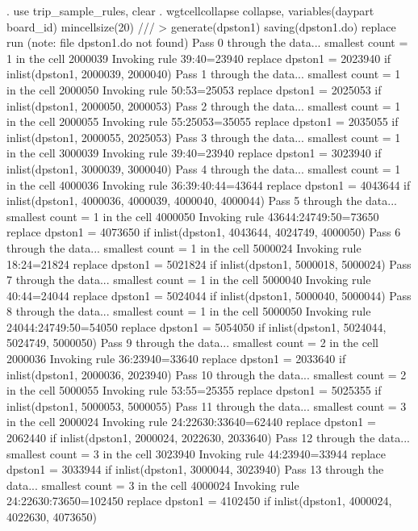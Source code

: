 . use trip_sample_rules, clear
{\smallskip}
. wgtcellcollapse collapse, variables(daypart board_id) mincellsize(20) ///
>         generate(dpston1) saving(dpston1.do) replace run
(note: file dpston1.do not found)
Pass 0 through the data...
  smallest count = 1 in the cell      2000039
  Invoking rule 39:40=23940
  replace dpston1 = 2023940 if inlist(dpston1, 2000039, 2000040)
Pass 1 through the data...
  smallest count = 1 in the cell      2000050
  Invoking rule 50:53=25053
  replace dpston1 = 2025053 if inlist(dpston1, 2000050, 2000053)
Pass 2 through the data...
  smallest count = 1 in the cell      2000055
  Invoking rule 55:25053=35055
  replace dpston1 = 2035055 if inlist(dpston1, 2000055, 2025053)
Pass 3 through the data...
  smallest count = 1 in the cell      3000039
  Invoking rule 39:40=23940
  replace dpston1 = 3023940 if inlist(dpston1, 3000039, 3000040)
Pass 4 through the data...
  smallest count = 1 in the cell      4000036
  Invoking rule 36:39:40:44=43644
  replace dpston1 = 4043644 if inlist(dpston1, 4000036, 4000039, 4000040, 4000044)
Pass 5 through the data...
  smallest count = 1 in the cell      4000050
  Invoking rule 43644:24749:50=73650
  replace dpston1 = 4073650 if inlist(dpston1, 4043644, 4024749, 4000050)
Pass 6 through the data...
  smallest count = 1 in the cell      5000024
  Invoking rule 18:24=21824
  replace dpston1 = 5021824 if inlist(dpston1, 5000018, 5000024)
Pass 7 through the data...
  smallest count = 1 in the cell      5000040
  Invoking rule 40:44=24044
  replace dpston1 = 5024044 if inlist(dpston1, 5000040, 5000044)
Pass 8 through the data...
  smallest count = 1 in the cell      5000050
  Invoking rule 24044:24749:50=54050
  replace dpston1 = 5054050 if inlist(dpston1, 5024044, 5024749, 5000050)
Pass 9 through the data...
  smallest count = 2 in the cell      2000036
  Invoking rule 36:23940=33640
  replace dpston1 = 2033640 if inlist(dpston1, 2000036, 2023940)
Pass 10 through the data...
  smallest count = 2 in the cell      5000055
  Invoking rule 53:55=25355
  replace dpston1 = 5025355 if inlist(dpston1, 5000053, 5000055)
Pass 11 through the data...
  smallest count = 3 in the cell      2000024
  Invoking rule 24:22630:33640=62440
  replace dpston1 = 2062440 if inlist(dpston1, 2000024, 2022630, 2033640)
Pass 12 through the data...
  smallest count = 3 in the cell      3023940
  Invoking rule 44:23940=33944
  replace dpston1 = 3033944 if inlist(dpston1, 3000044, 3023940)
Pass 13 through the data...
  smallest count = 3 in the cell      4000024
  Invoking rule 24:22630:73650=102450
  replace dpston1 = 4102450 if inlist(dpston1, 4000024, 4022630, 4073650)
